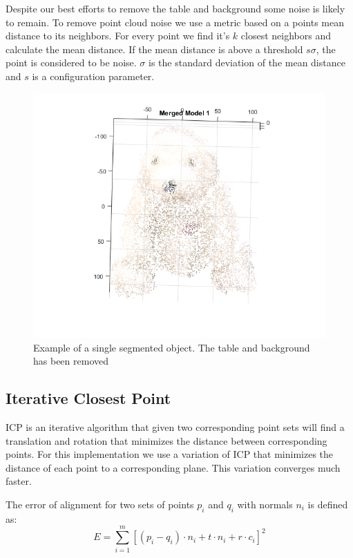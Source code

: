 \documentclass[conference]{IEEEtran}
\begin{document}
Despite our best efforts to remove the table and background some noise is likely to remain. To remove point cloud noise we use a metric based on a points mean distance to its neighbors. For every point we find it's $k$ closest neighbors and calculate the mean distance. If the mean distance is above a threshold $s\sigma$, the point is considered to be noise. $\sigma$ is the standard deviation of the mean distance and $s$ is a configuration parameter.

\begin{figure}
  \centering
    \includegraphics[width=\linewidth]{img/segmented2}
    \caption{Example of a single segmented object. The table and background has been removed}
    \label{fig:bear}
\end{figure}

\subsection{Iterative Closest Point}
ICP is an iterative algorithm that given two corresponding point sets will find a translation and rotation that minimizes the distance between corresponding points. For this implementation we use a variation of ICP that minimizes the distance of each point to a corresponding plane. This variation converges much faster. 

The error of alignment for two sets of points $p_i$ and $q_i$ with normals $n_i$ is defined as:
\[
E = \sum_{i=1}^{m}{[(p_i-q_i) \cdot n_i + t \cdot n_i + r \cdot c_i ]}^2 
\]
\end{document}
